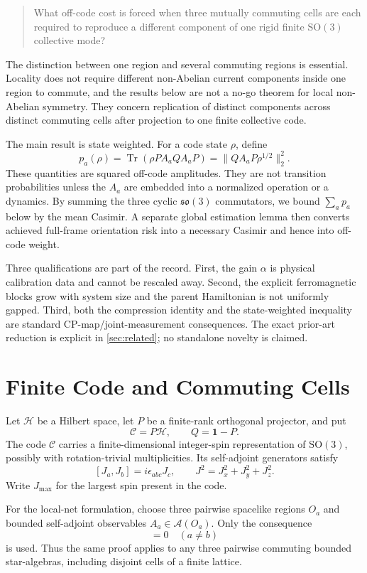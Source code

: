 \documentclass[11pt]{article}
\theoremstyle{remark}
\newcommand{\cH}{\mathcal H}
\newcommand{\cC}{\mathcal C}
\newcommand{\1}{\mathbf 1}
\newcommand{\Tr}{\operatorname{Tr}}
\newcommand{\SO}{\mathrm{SO}(3)}
\begin{document}
\begin{quote}
What off-code cost is forced when three mutually commuting cells are each
required to reproduce a different component of one rigid finite $\SO$
collective mode?
\end{quote}

The distinction between one region and several commuting regions is
essential. Locality does not require different non-Abelian current components
inside one region to commute, and the results below are not a no-go theorem
for local non-Abelian symmetry. They concern replication of distinct
components across distinct commuting cells after projection to one finite
collective code.

The main result is state weighted. For a code state $\rho$, define
\[
  p_a(\rho)=\Tr(\rho P A_aQ A_aP)
           =\lVert Q A_aP\rho^{1/2}\rVert_2^2.
\]
These quantities are squared off-code amplitudes. They are not transition
probabilities unless the $A_a$ are embedded into a normalized operation or a
dynamics. By summing the three cyclic $\mathfrak{so}(3)$ commutators, we bound
$\sum_a p_a$ below by the mean Casimir. A separate global estimation lemma
then converts achieved full-frame orientation risk into a necessary Casimir
and hence into off-code weight.

Three qualifications are part of the record. First, the gain $\alpha$ is
physical calibration data and cannot be rescaled away. Second, the explicit
ferromagnetic blocks grow with system size and the parent Hamiltonian is not
uniformly gapped. Third, both the compression identity and the state-weighted
inequality are standard CP-map/joint-measurement consequences. The exact
prior-art reduction is explicit in \cref{sec:related}; no standalone novelty
is claimed.

\section{Finite Code and Commuting Cells}
\label{sec:setup}

Let $\cH$ be a Hilbert space, let $P$ be a finite-rank orthogonal projector,
and put
\[
  \cC=P\cH,\qquad Q=\1-P.
\]
The code $\cC$ carries a finite-dimensional integer-spin representation of
$\SO$, possibly with rotation-trivial multiplicities. Its self-adjoint
generators satisfy
\[
  [J_a,J_b]=i\epsilon_{abc}J_c,
  \qquad J^2=J_x^2+J_y^2+J_z^2.
\]
Write $J_{\max}$ for the largest spin present in the code.

For the local-net formulation, choose three pairwise spacelike regions
$O_a$ and bounded self-adjoint observables $A_a\in\mathcal A(O_a)$. Only the
consequence
\begin{equation}
  [A_a,A_b]=0\quad(a\neq b)
  \label{eq:cell-commutation}
\end{equation}
is used. Thus the same proof applies to any three pairwise commuting bounded
star-algebras, including disjoint cells of a finite lattice.
\end{document}
